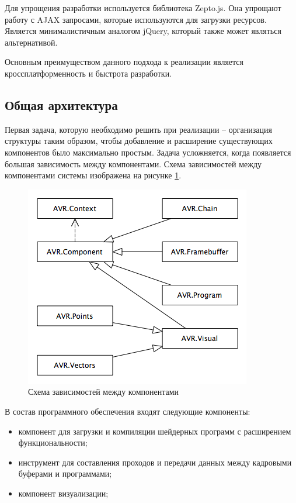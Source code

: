 Для упрощения разработки используется библиотека Zepto.js. Она упрощают работу с AJAX запросами, 
которые используются для загрузки ресурсов. Является минималистичным аналогом jQuery, 
который также может являться альтернативой.

Основным преимуществом данного подхода к реализации является кроссплатформенность и быстрота 
разработки.

\subsection{Общая архитектура}

Первая задача, которую необходимо решить при реализации -- организация структуры таким образом, 
чтобы добавление и расширение существующих компонентов было максимально простым. Задача
усложняется, когда появляется большая зависимость между компонентами. Схема зависимостей
между компонентами системы изображена на рисунке \ref{fig:architecture}.

\begin{figure}
\begin{center}
  \includegraphics[scale=1]{Figures/architecture}
\end{center}
\caption{Схема зависимостей между компонентами}
\label{fig:architecture}
\end{figure}


В состав программного обеспечения входят следующие компоненты:

\begin{itemize}
  \item компонент для загрузки и компиляции шейдерных программ с расширением
    функциональности;
  \item инструмент для составления проходов и передачи данных между кадровыми буферами и 
    программами;
  \item компонент визуализации;
\end{itemize}

